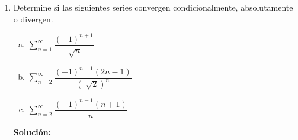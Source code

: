 \documentclass[12pt]{article}
\newenvironment{solucion}
{\begin{mdframed}[backgroundcolor=black!10]
		{\bf Solución:}\\
	}
	{
	\end{mdframed}
}
\newenvironment{preguntas}
{\begin{enumerate}\itemsep12pt
	}
	{
	\end{enumerate}
}
\newcommand{\ra}{\rightarrow}
\begin{document}
\begin{preguntas}
\begin{solucion}
		Veamos la convergencia de 
		$$\sum\limits_{n=1}^{\infty}e^{-n}$$
		Usando el criterio de la razón,
		$$\lim\limits_{n \ra \infty} \dfrac{a_{n+1}}{a_n}
		= \lim\limits_{n \ra \infty} \dfrac{e^{-n-1}}{e^{-n}}
		= e^{-1} < 1$$
		Por lo tanto, es convergente. De la misma forma, la serie $\sum\limits_{n=1}^{\infty}f(n)$ también lo es.
\end{solucion}
\item Determine si las siguientes series convergen condicionalmente, absolutamente o divergen.
\begin{enumerate}[a)]
\item $\sum\limits_{n=1}^{\infty}\dfrac{(-1)^{n+1}}{\sqrt[]{n}}$
\item $\sum\limits_{n=2}^{\infty}\dfrac{(-1)^{n-1}(2n-1)}{(\sqrt[]{2})^n}$
\item $\sum\limits_{n=2}^{\infty}\dfrac{(-1)^{n-1}(n+1)}{n}$
\end{enumerate}
\begin{solucion}


\end{solucion}
\end{preguntas}
\end{document}
